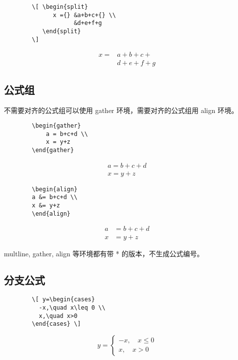 \documentclass[a4paper]{article}
\newcommand\bpics[1]{\par\vspace{1ex}\noindent\begin{minipage}{\textwidth}\begin{minipage}{#1\textwidth}}
\newcommand\mpics[1]{\end{minipage}\begin{minipage}{#1\textwidth}\linespread{1}}
\newcommand\epics{\end{minipage}\end{minipage}\par\vspace{2ex}}
\begin{document}
    \bpics{0.6}\begin{verbatim}
        \[ \begin{split}
              x ={} &a+b+c+{} \\
                    &d+e+f+g
           \end{split}
        \]\end{verbatim}
    \mpics{0.3}
        \[ \begin{split}
             x ={} &a+b+c+{} \\
                   &d+e+f+g
            \end{split}  \]
    \epics

  \subsection{公式组}
      不需要对齐的公式组可以使用 gather 环境，需要对齐的公式组用 align 环境。

    \bpics{0.6}\begin{verbatim}
        \begin{gather}
            a = b+c+d \\
            x = y+z
        \end{gather}\end{verbatim}
    \mpics{0.3}
        \begin{gather}
          a = b+c+d \\
          x = y+z
        \end{gather}
    \epics

    \bpics{0.6}\begin{verbatim}
        \begin{align}
        a &= b+c+d \\
        x &= y+z
        \end{align}\end{verbatim}
    \mpics{0.3}
        \begin{align}
          a &= b+c+d \\
          x &= y+z
        \end{align}
    \epics

    multline, gather, align 等环境都有带 * 的版本，不生成公式编号。
  \subsection{分支公式}
    \bpics{0.6}\begin{verbatim}
        \[ y=\begin{cases}
          -x,\quad x\leq 0 \\
          x,\quad x>0
        \end{cases} \]\end{verbatim}
    \mpics{0.3}
        \[ y=\begin{cases}
          -x,\quad x\leq 0 \\
          x,\quad x>0
        \end{cases} \]
    \epics
\end{document}
